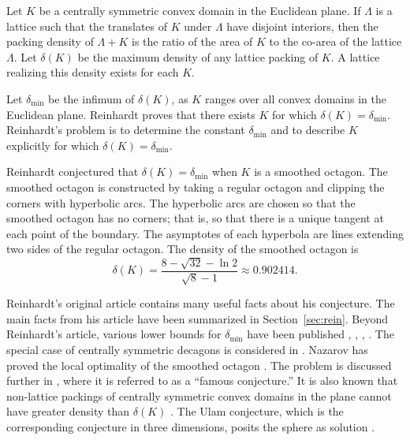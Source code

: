 \documentclass[11pt]{amsart}
\def\deltalat{\mathbb\delta}  %
\def\delt{\delta_{\min}}
\begin{document}
Let $K$ be a centrally symmetric convex domain in the Euclidean plane.
If $\Lambda$ is a lattice such that the translates of $K$ under
$\Lambda$ have disjoint interiors, then the packing density of
$\Lambda+K$ is the ratio of the area of $K$ to the co-area of the
lattice $\Lambda$.  Let $\deltalat(K)$ be the maximum density of any
lattice packing of $K$.  A lattice realizing this density exists for
each $K$.

Let $\delt$ be the infimum of $\deltalat(K)$, as $K$ ranges over all
convex domains in the Euclidean plane.  Reinhardt proves that there
exists $K$ for which $\deltalat(K)=\delt$.  Reinhardt's problem is to
determine the constant $\delt$ and to describe $K$ explicitly for
which $\deltalat(K)=\delt$.

Reinhardt conjectured that $\deltalat(K) =\delt$ when $K$ is a
smoothed octagon.  The smoothed octagon is constructed by taking a
regular octagon and clipping the corners with hyperbolic arcs.  The
hyperbolic arcs are chosen so that the smoothed octagon has no
corners; that is, so that there is a unique tangent at each point of
the boundary.  The asymptotes of each hyperbola are lines extending
two sides of the regular octagon.  The density of the smoothed octagon
is
\[\deltalat(K) = \frac{8 - \sqrt{32} - \ln{2}}{\sqrt8 - 1}\approx 0.902414.\]

Reinhardt's original article contains many useful facts about his
conjecture.  The main facts from his article have been summarized in
Section~\ref{sec:rein}.  Beyond Reinhardt's article, various lower
bounds for $\delt$ have been published \cite{MH}, \cite{FT}, \cite{T},
\cite{E}.  The special case of centrally symmetric decagons is
considered in \cite{LM}.  Nazarov has proved the local optimality of
the smoothed octagon \cite{N}. The problem is discussed further in
\cite{AP}, where it is referred to as a ``famous conjecture.''   
It is
also known that non-lattice packings of centrally symmetric convex
domains in the plane cannot have greater density than $\deltalat(K)$
\cite{FT50}.  The Ulam conjecture, which is the corresponding
conjecture in three dimensions, posits the sphere as solution
\cite{G}.
\end{document}
